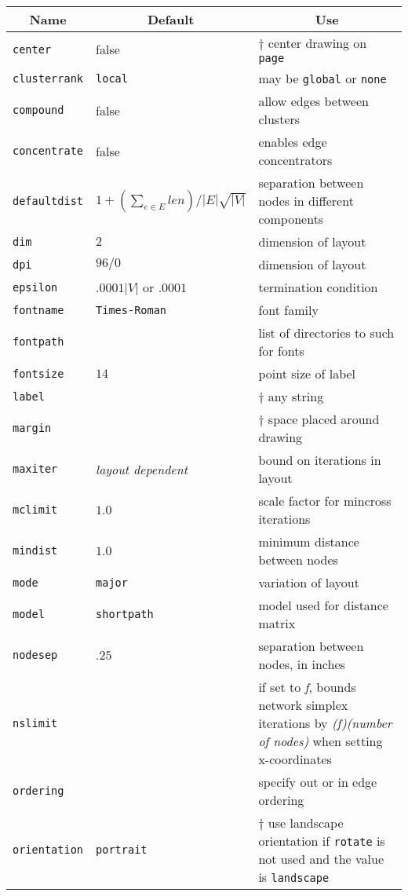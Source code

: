 \begin{table}[htbp]\footnotesize
\centering
\begin{tabular}[t]{|l|l|p{2.5in}|} \hline
\multicolumn{1}{|c|}{Name} & \multicolumn{1}{c|}{Default} & \multicolumn{1}{c|}{Use} \\ \hline
{\tt center} & false & $\dagger$ center drawing on {\tt page} \\ 
{\tt clusterrank} & {\tt local} & may be {\tt global} or {\tt none} \\
{\tt compound} & false & allow edges between clusters \\
{\tt concentrate} & false & enables edge concentrators  \\
{\tt defaultdist} & $1+(\sum_{e \in E} len)/|E|\sqrt{|V|}$  & separation between nodes in different components \\
{\tt dim} & $2$ & dimension of layout  \\
{\tt dpi} & $96/0$ & dimension of layout  \\
{\tt epsilon} & $.0001 |V|$ or $.0001$ & termination condition  \\
{\tt fontname} & {\tt Times-Roman} & font family \\
{\tt fontpath} &  & list of directories to such for fonts \\
{\tt fontsize} & $14$ & point size of label \\
{\tt label} & & $\dagger$ any string \\
{\tt margin} & & $\dagger$ space placed around drawing \\
{\tt maxiter} & {\em layout dependent} & bound on iterations in layout \\
{\tt mclimit} & $1.0$ & scale factor for mincross iterations \\
{\tt mindist} & $1.0$ & minimum distance between nodes \\
{\tt mode} & {\tt major} & variation of layout \\
{\tt model} & {\tt shortpath} & model used for distance matrix \\
{\tt nodesep} & $.25$ & separation between nodes, in inches \\
{\tt nslimit} & & if set to {\it f}, bounds network simplex iterations by {\it (f)(number of nodes)} when setting x-coordinates \\
{\tt ordering} &  & specify out or in edge ordering \\
{\tt orientation} & {\tt portrait} & $\dagger$ use landscape orientation if {\tt rotate} is not used and the value is {\tt landscape} \\

\end{tabular}
\end{table}

